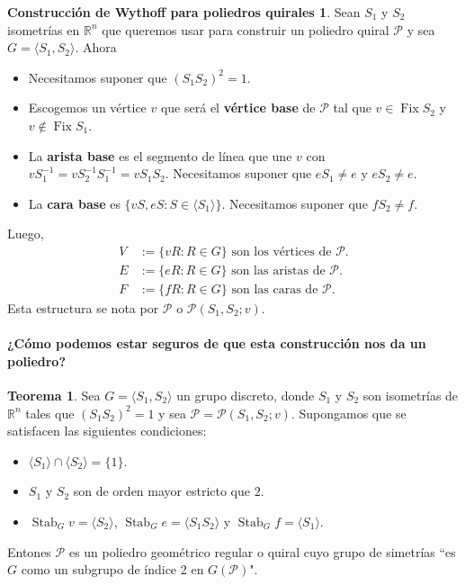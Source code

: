 \documentclass[spanish]{article}
\theoremstyle{definition}
\newtheorem*{teo}{Teorema}
\newtheorem*{Wqui}{Construcción de Wythoff para poliedros quirales}
\newcommand{\R}{\mathbb{R}}
\newcommand{\p}{\mathcal{P}}
\DeclareMathOperator{\Fix}{Fix}
\DeclareMathOperator{\Stab}{Stab}
\begin{document}
\begin{Wqui}
	Sean $S_1$ y $S_2$ isometrías en $\R^n$ que queremos usar para construir un poliedro quiral $\p$  y sea $G=\langle S_1,S_2\rangle$. Ahora
	\begin{itemize}
		\item Necesitamos suponer que $(S_1S_2)^2=1$.
		\item Escogemos un vértice $v$ que será el \textbf{vértice base} de $\p$ tal que $v\in\Fix S_2$ y $v\notin\Fix S_1$.
		\item La \textbf{arista base} es el segmento de línea que une $v$ con $vS_1^{-1}=vS_2^{-1}S_1^{-1}=vS_1S_2$. Necesitamos suponer que $eS_1\neq e$ y $eS_2\neq e$.
		\item La \textbf{cara base} es $\{vS,eS:S\in\langle S_1\rangle\}$. Necesitamos suponer que $fS_2\neq f$.
	\end{itemize}
	Luego,
	\begin{align*}
		V&:=\{vR:R\in G\}\text{ son los vértices de } \p.\\ 
		E&:=\{eR:R\in G\} \text{ son las aristas de } \p.\\ 
		F&:=\{fR:R\in G\} \text{ son las caras de } \p.
	\end{align*}
	Esta estructura se nota por $\p$ o $\p(S_1,S_2;v)$.
\end{Wqui}

\paragraph{¿Cómo podemos estar seguros de que esta construcción nos da un poliedro?}
\begin{teo}\label{teo:bris1}
	Sea $G=\langle S_1,S_2\rangle$ un grupo discreto, donde $S_1$ y $S_2$ son isometrías de $\R^n$ tales que $(S_1S_2)^2=1$ y sea $\p=\p(S_1,S_2;v)$. Supongamos que se satisfacen las siguientes condiciones:
	\begin{itemize}
		\item $\langle S_1\rangle\cap\langle S_2\rangle=\{1\}$.
		\item $S_1$ y $S_2$ son de orden mayor estricto que 2.
		\item $\Stab_G v=\langle S_2\rangle$, $\Stab_G e=\langle S_1S_2\rangle$ y $\Stab_G f=\langle S_1\rangle$.
	\end{itemize}
	Entones $\p$ es un poliedro geométrico regular o quiral cuyo grupo de simetrías ``es $G$ como un subgrupo de índice 2 en $G(\p)$".
\end{teo}
\end{document}
